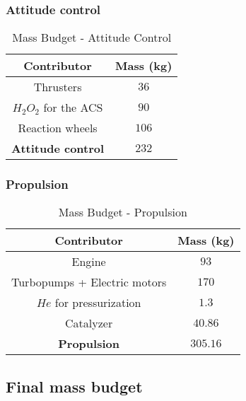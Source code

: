 \subsubsection{Attitude control}
\begin{table}
	
\begin{center}
\begin{tabular}[H]{|c|c|}
	\hline
	\cellcolor{gray!50}Contributor & \cellcolor{gray!50}Mass (kg)\\
	\hline
	Thrusters & $36$\\
	\hline
	$H_2O_2$ for the ACS & $90$\\
	\hline
	
	Reaction wheels & $106$\\
	\hline
	\cellcolor{green!30}\textbf{Attitude control} & \textbf{$232$}\\
	\hline
\end{tabular}
\end{center}
\caption{Mass Budget - Attitude Control}
\end{table}
\subsubsection{Propulsion}
\begin{table}
	
\begin{center}
\begin{tabular}[H]{|c|c|}
	\hline
	\cellcolor{gray!50}Contributor & \cellcolor{gray!50}Mass (kg)\\
	\hline
	Engine & $93$\\
	\hline
	Turbopumps + Electric motors & $170$\\
	\hline
	$He$ for pressurization & $1.3$\\
	\hline
	Catalyzer & $40.86$\\
	\hline
	\cellcolor{green!30}\textbf{Propulsion} & \textbf{$305.16$}\\
	\hline
\end{tabular}
\end{center}
\caption{Mass Budget - Propulsion}

\end{table}
\subsection{Final mass budget}

